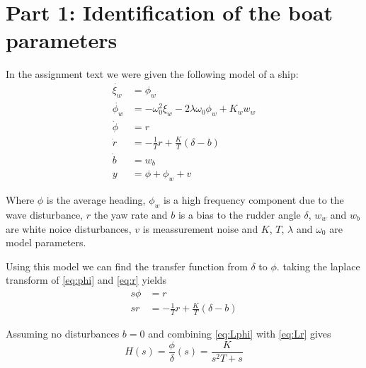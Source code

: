 \section{Part 1: Identification of the boat  parameters}

In the assignment text we were given the following model of a ship:
\begin{subequations}
	\label{eq:completeModel}
		\begin{align}
				\dot{\xi_w} &= \phi_w \label{eq:xi_w}\\
				\dot{\phi_w} &= -\omega_0^2\xi_w-2\lambda\omega_0\phi_w+K_ww_w \label{eq:phi_w}\\
				\dot{\phi} &= r \label{eq:phi} \\
				\dot{r} &= -\frac{1}{T}r+\frac{K}{T}(\delta-b) \label{eq:r} \\
				\dot{b} &= w_b \label{eq:b} \\
				y &= \phi + \phi_w + v \label{eq:y}
		\end{align}
\end{subequations}

Where $\phi$ is the average heading, $\phi_w$ is a high frequency component due to the wave disturbance, $r$ the yaw rate and $b$ is a bias to the rudder angle $\delta$, $w_w$ and $w_b$ are white noice disturbances, $v$ is meassurement noise and $K$, $T$, $\lambda$ and $\omega_0$ are model parameters.

Using this model we can find the transfer function from $\delta$ to $\phi$. taking the laplace transform of \cref{eq:phi} and \cref{eq:r} yields
\begin{subequations}
	\begin{align}
		s\phi &= r \label{eq:Lphi}\\
		sr &= -\frac{1}{T}r+\frac{K}{T}(\delta-b) \label{eq:Lr}
	\end{align}
\end{subequations}

Assuming no disturbances $b = 0$ and combining \cref{eq:Lphi} with \cref{eq:Lr} gives
\begin{equation}
	H(s) = \frac{\phi}{\delta}(s) = \frac{K}{s^2T+s}
\end{equation}
